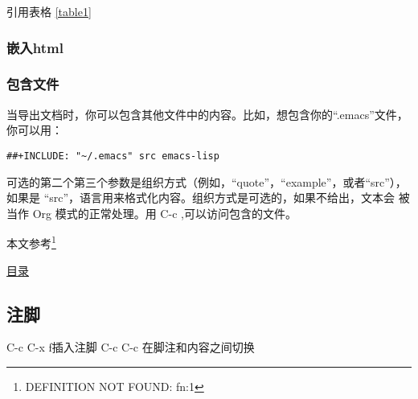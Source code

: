 \documentclass[11pt]{article}
\begin{document}
引用表格
\ref{table1}
\subsubsection{嵌入html}
\label{sec-6-4-1}
\subsubsection{包含文件}
\label{sec-6-4-2}

当导出文档时，你可以包含其他文件中的内容。比如，想包含你的“.emacs”文件，
你可以用：

\begin{verbatim}
##+INCLUDE: "~/.emacs" src emacs-lisp
\end{verbatim}
可选的第二个第三个参数是组织方式（例如，“quote”，“example”，或者“src”），
如果是 “src”，语言用来格式化内容。组织方式是可选的，如果不给出，文本会
被当作 Org 模式的正常处理。用 C-c ,可以访问包含的文件。

本文参考\footnote{DEFINITION NOT FOUND: fn:1 }

\hyperref[content-position]{目录}
\subsection{注脚}
\label{sec-6-5}

C-c C-x f插入注脚
C-c C-c 在脚注和内容之间切换
\end{document}

